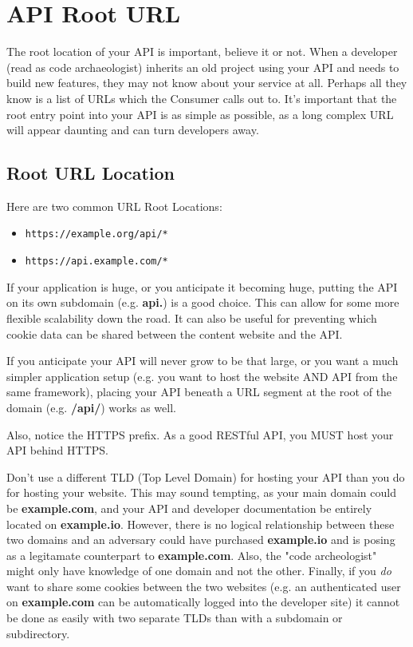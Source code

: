 \documentclass{book}
\begin{document}
\chapter{API Root URL}

The root location of your API is important, believe it or not. When a developer (read as code archaeologist) inherits an old project using your API and needs to build new features, they may not know about your service at all. Perhaps all they know is a list of URLs which the Consumer calls out to. It's important that the root entry point into your API is as simple as possible, as a long complex URL will appear daunting and can turn developers away.

\section{Root URL Location}

Here are two common URL Root Locations:

\begin{itemize}
\item \texttt{https://example.org/api/*}
\item \texttt{https://api.example.com/*}
\end{itemize}

If your application is huge, or you anticipate it becoming huge, putting the API on its own subdomain (e.g. \textbf{api.}) is a good choice. This can allow for some more flexible scalability down the road. It can also be useful for preventing which cookie data can be shared between the content website and the API.

If you anticipate your API will never grow to be that large, or you want a much simpler application setup (e.g. you want to host the website AND API from the same framework), placing your API beneath a URL segment at the root of the domain (e.g. \textbf{/api/}) works as well.

Also, notice the HTTPS prefix. As a good RESTful API, you MUST host your API behind HTTPS.

Don't use a different TLD (Top Level Domain) for hosting your API than you do for hosting your website. This may sound tempting, as your main domain could be \textbf{example.com}, and your API and developer documentation be entirely located on \textbf{example.io}. However, there is no logical relationship between these two domains and an adversary could have purchased \textbf{example.io} and is posing as a legitamate counterpart to \textbf{example.com}. Also, the "code archeologist" might only have knowledge of one domain and not the other. Finally, if you \emph{do} want to share some cookies between the two websites (e.g. an authenticated user on \textbf{example.com} can be automatically logged into the developer site) it cannot be done as easily with two separate TLDs than with a subdomain or subdirectory.
\end{document}
